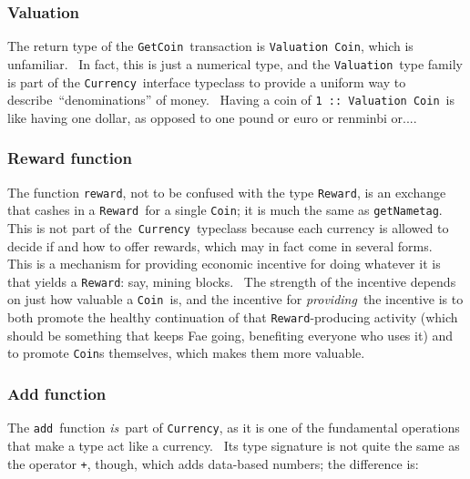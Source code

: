 \documentclass[11pt]{article}
\begin{document}
\subsubsection{Valuation}
\vspace{5.5pt}

The return type of the \texttt{GetCoin} transaction is \texttt{Valuation Coin}, which is unfamiliar.  In fact, this is just a numerical type, and the \texttt{Valuation} type family is part of the \texttt{Currency} interface typeclass to provide a uniform way to describe “denominations” of money.  Having a coin of \texttt{1 :: Valuation Coin} is like having one dollar, as opposed to one pound or euro or renminbi or....

\subsubsection{Reward function}
\vspace{5.5pt}

The function \texttt{reward}, not to be confused with the type \texttt{Reward}, is an exchange that cashes in a \texttt{Reward} for a single \texttt{Coin}; it is much the same as \texttt{getNametag}.  This is not part of the \texttt{Currency} typeclass because each currency is allowed to decide if and how to offer rewards, which may in fact come in several forms.  This is a mechanism for providing economic incentive for doing whatever it is that yields a \texttt{Reward}: say, mining blocks.  The strength of the incentive depends on just how valuable a \texttt{Coin} is, and the incentive for \textit{providing} the incentive is to both promote the healthy continuation of that \texttt{Reward}-producing activity (which should be something that keeps Fae going, benefiting everyone who uses it) and to promote \texttt{Coin}s themselves, which makes them more valuable.

\subsubsection{Add function}
\vspace{5.5pt}

The \texttt{add} function \textit{is} part of \texttt{Currency}, as it is one of the fundamental operations that make a type act like a currency.  Its type signature is not quite the same as the operator \texttt{+}, though, which adds data-based numbers; the difference is:
\end{document}
